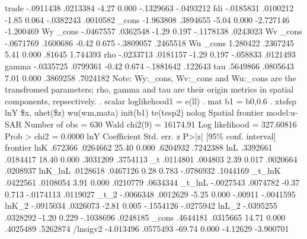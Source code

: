        trade {\VBAR}  -.0911438   .0213384    -4.27   0.000    -.1329663   -.0493212
         fdi {\VBAR}  -.0185831   .0100212    -1.85   0.064    -.0382243    .0010582
       _cons {\VBAR}  -1.963808   .3894655    -5.04   0.000    -2.727146   -1.200469
Wy           {\VBAR}
       _cons {\VBAR}  -.0467557   .0362548    -1.29   0.197    -.1178138    .0243023
Wv           {\VBAR}
       _cons {\VBAR}  -.0671769   .1600686    -0.42   0.675    -.3809057    .2465518
Wu           {\VBAR}
       _cons {\VBAR}   1.280422   .2367245     5.41   0.000       .81645    1.744393
         rho {\VBAR}  -.0233713   .0181157    -1.29   0.197     -.058833    .0121493
       gamma {\VBAR}  -.0335725   .0799361    -0.42   0.674    -.1881642     .122643
         tau {\VBAR}   .5649866   .0805643     7.01   0.000     .3869258    .7024182
Note: Wy:_cons, Wv:_cons and Wu:_cons are the transfromed parameters;
      rho, gamma and tau are their origin metrics in spatial components, repsectively.
{\smallskip}
. scalar loglikehood1 =  e(ll)
{\smallskip}
. mat b1 = b0,0.6
{\smallskip}
. xtsfsp lnY \$x, uhet(\$z)  wu(wm,mata)  init(b1) te(tesp2)  nolog
{\smallskip}
Spatial frontier model:u-SAR                          Number of obs =      630
                                                      Wald chi2(9)  = 16174.91
Log likelihood = 327.60816                            Prob > chi2   =   0.0000
{\smallskip}
         lnY {\VBAR} Coefficient  Std. err.      z    P>|z|     [95\% conf. interval]
frontier     {\VBAR}
         lnK {\VBAR}    .672366   .0264662    25.40   0.000     .6204932    .7242388
         lnL {\VBAR}   .3392661   .0184417    18.40   0.000     .3031209    .3754113
          _t {\VBAR}   .0114801    .004803     2.39   0.017     .0020664    .0208937
     lnK_lnL {\VBAR}   .0128618   .0467126     0.28   0.783    -.0786932    .1044169
      _t_lnK {\VBAR}   .0422561   .0108054     3.91   0.000     .0210779    .0634344
      _t_lnL {\VBAR}  -.0027543   .0074782    -0.37   0.713    -.0174113    .0119027
        _t_2 {\VBAR}  -.0066348   .0012629    -5.25   0.000      -.00911   -.0041595
       lnK_2 {\VBAR}  -.0915034   .0326073    -2.81   0.005    -.1554126   -.0275942
       lnL_2 {\VBAR}  -.0395255   .0328292    -1.20   0.229    -.1038696    .0248185
       _cons {\VBAR}   .4644181   .0315665    14.71   0.000     .4025489    .5262874
    /lnsigv2 {\VBAR}  -4.013496   .0575493   -69.74   0.000     -4.12629   -3.900701
